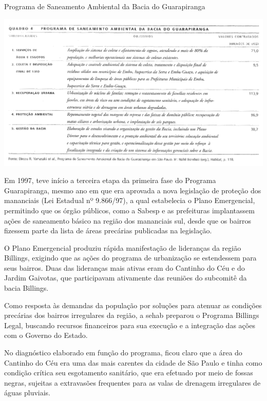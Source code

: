 	\begin{table}[htb]
		\centering
		\caption{Programa de Saneamento Ambiental da Bacia do Guarapiranga}
		\includegraphics[width=\linewidth]{img/francca_p029_tabela_programa}
		\label{tab:francca_programa}
	\end{table}
	
	Em 1997, teve início a terceira etapa da primeira fase do Programa Guarapiranga, mesmo ano em que era aprovada a nova legislação de proteção dos mananciais (Lei Estadual nº 9.866/97), a qual estabelecia o Plano Emergencial, permitindo que os órgão públicos, como a Sabesp e as prefeituras implantassem ações de saneamento básico na região dos mananciais sul, desde que os bairros fizessem parte da lista de áreas precárias publicadas na legislação.
	
	O Plano Emergencial produziu rápida manifestação de lideranças da região Billings, exigindo que as ações do programa de urbanização se estendessem para seus bairros. Duas das lideranças mais ativas eram do Cantinho do Céu e do Jardim Gaivotas, que participavam ativamente das reuniões do subcomitê da bacia Billings.
	
	Como resposta às demandas da população por soluções para atenuar as condições precárias dos bairros irregulares da região, a \gls{sehab} preparou o Programa Billings Legal, buscando recursos financeiros para sua execução e a integração das ações com o Governo do Estado.
	
	No diagnóstico elaborado em função do programa, ficou claro que a área do Cantinho do Céu era uma das mais carentes da cidade de São Paulo e tinha como condição crítica seu esgotamento sanitário, que era efetuado por meio de fossas negras, sujeitas a extravasões frequentes para as valas de drenagem irregulares de águas pluviais.
	
